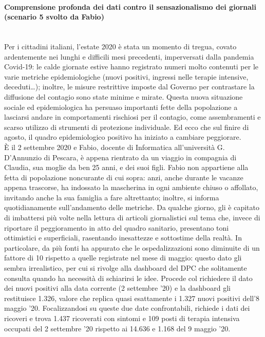 \paragraph{Comprensione profonda dei dati contro il sensazionalismo dei giornali (scenario 5 svolto da Fabio)}\mbox{}\\
Per i cittadini italiani, l'estate 2020 è stata un momento di tregua, covato ardentemente nei lunghi e difficili mesi precedenti, imperversati dalla pandemia Covid-19: le calde giornate estive hanno registrato numeri molto contenuti per le varie metriche epidemiologiche (nuovi positivi, ingressi nelle terapie intensive, deceduti…); inoltre, le misure restrittive imposte dal Governo per contrastare la diffusione del contagio sono state minime e mirate.
Questa nuova situazione sociale ed epidemiologica ha persuaso importanti fette della popolazione a lasciarsi andare in comportamenti rischiosi per il contagio, come assembramenti e scarso utilizzo di strumenti di protezione individuale.
Ed ecco che sul finire di agosto, il quadro epidemiologico positivo ha iniziato a cambiare peggiorare.\\
È il 2 settembre 2020 e Fabio, docente di Informatica all'università G. D'Annunzio di Pescara, è appena rientrato da un viaggio in compagnia di Claudia, sua moglie da ben 25 anni, e dei suoi figli.
Fabio non appartiene alla fetta di popolazione noncurante di cui sopra: anzi, anche durante le vacanze appena trascorse, ha indossato la mascherina in ogni ambiente chiuso o affollato, invitando anche la sua famiglia a fare altrettanto; inoltre, si informa quotidianamente sull'andamento delle metriche.
Da qualche giorno, gli è capitato di imbattersi più volte nella lettura di articoli giornalistici sul tema che, invece di riportare il peggioramento in atto del quadro sanitario, presentano toni ottimistici e superficiali, rasentando inesattezze e sottostime della realtà.
In particolare, da più fonti ha appurato che le ospedalizzazioni sono diminuite di un fattore di 10 rispetto a quelle registrate nel mese di maggio: questo dato gli sembra irrealistico, per cui si rivolge alla dashboard del DPC che solitamente consulta quando ha necessità di schiarirsi le idee.
Procede col richiedere il dato dei nuovi positivi alla data corrente (2 settembre '20) e la dashboard gli restituisce 1.326, valore che replica quasi esattamente i 1.327 nuovi positivi dell'8 maggio '20.
Focalizzandosi su queste due date confrontabili, richiede i dati dei ricoveri e trova 1.437 ricoverati con sintomi e 109 posti di terapia intensiva occupati del 2 settembre '20 rispetto ai 14.636 e 1.168 del 9 maggio '20.
